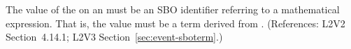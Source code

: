 The value of the   on an \Event must be an SBO
identifier referring to a mathematical expression.  That is, the value must
be a term derived from \sboevent.  (References: L2V2 Section~4.14.1; L2V3
Section~\ref{sec:event-sboterm}.)
